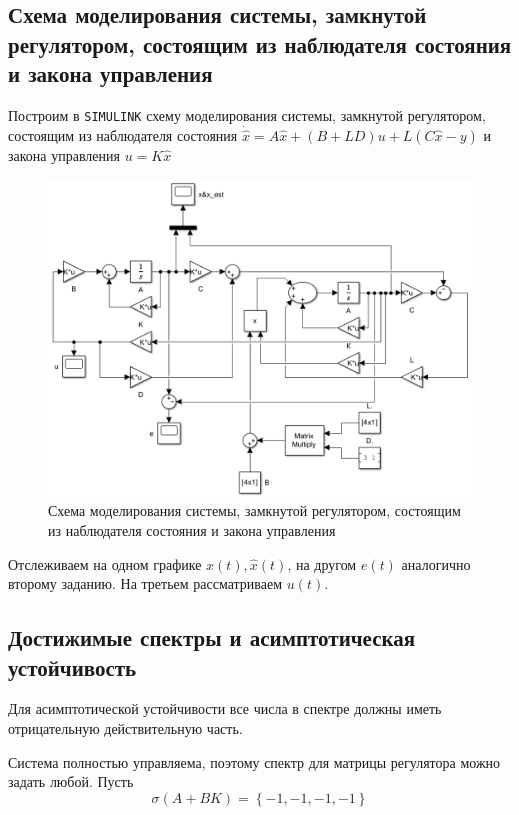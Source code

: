 \documentclass[a4paper, 12pt]{article}
\begin{document}
    \subsection{Схема моделирования системы, замкнутой регулятором, состоящим из наблюдателя состояния и закона управления}
    Построим в \texttt{SIMULINK} схему моделирования системы, замкнутой регулятором, состоящим из наблюдателя состояния
    $\dot{\hat{x}}=A\hat{x}+\left(B+LD\right)u+L\left(C\hat{x}-y\right)$ и закона управления $u=K\hat{x}$
    \begin{figure}[H]
        \centering
        \includegraphics[scale=0.5]{scheme_task3.png}
        \captionsetup{skip=0pt}
        \caption{Схема моделирования системы, замкнутой регулятором, состоящим из наблюдателя состояния и закона управления}
        \label{fig:scheme_task3}
    \end{figure}
    \noindent Отслеживаем на одном графике $x(t),\hat{x}(t)$, на другом $e(t)$ аналогично второму заданию.
    На третьем рассматриваем $u(t)$.


    \subsection{Достижимые спектры и асимптотическая устойчивость}
    Для асимптотической устойчивости все числа в спектре должны иметь отрицательную действительную часть.
    
    
    Система полностью управляема, поэтому спектр для матрицы регулятора можно задать любой. Пусть
    $$
    \sigma\left(A+BK\right)=\left\{-1,-1,-1,-1\right\}
    $$
\end{document}
